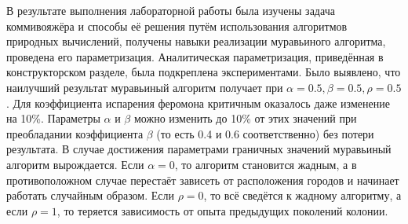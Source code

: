 \documentclass[../main.tex]{subfiles}
\begin{document}
	В результате выполнения лабораторной работы была изучены задача коммивояжёра и способы её решения путём использования алгоритмов природных вычислений, получены навыки реализации муравьиного алгоритма, проведена его параметризация. 
	Аналитическая параметризация, приведённая в конструкторском разделе, была подкреплена экспериментами. Было выявлено, что наилучший результат муравьиный алгоритм получает при $\alpha = 0.5, \beta = 0.5, ρ = 0.5$. 
	Для коэффициента испарения феромона критичным оказалось даже изменение на 10\%. Параметры $\alpha$ и $\beta$ можно изменить до 10\% от этих значений при преобладании коэффициента $\beta$ (то есть 0.4 и 0.6 соответственно) без потери результата. 
	В случае достижения параметрами граничных значений муравьиный алгоритм вырождается. Если $\alpha = 0$, то алгоритм становится жадным, а в противоположном случае перестаёт зависеть от расположения городов и начинает работать случайным образом. 
	Если $ρ = 0$, то всё сведётся к жадному алгоритму, а если $ρ = 1$, то теряется зависимость от опыта предыдущих поколений колонии.
\end{document}
